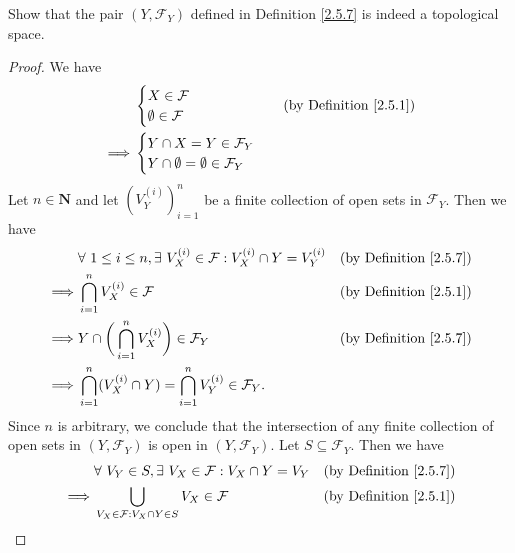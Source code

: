 \begin{exercise}\label{ex 2.5.12}
    Show that the pair \((Y, \mathcal{F}_Y)\) defined in Definition \ref{2.5.7} is indeed a topological space.
\end{exercise}

\begin{proof}
    We have
    \begin{align*}
                 & \begin{cases}
            X \in \mathcal{F} \\
            \emptyset \in \mathcal{F}
        \end{cases} & \text{(by Definition \ref{2.5.1})} \\
        \implies & \begin{cases}
            Y \cap X = Y \in \mathcal{F}_Y \\
            Y \cap \emptyset = \emptyset \in \mathcal{F}_Y
        \end{cases}
    \end{align*}
    Let \(n \in \mathbf{N}\) and let \((V_Y^{(i)})_{i = 1}^n\) be a finite collection of open sets in \(\mathcal{F}_Y\).
    Then we have
    \begin{align*}
                 & \forall\ 1 \leq i \leq n, \exists\ V_X^{(i)} \in \mathcal{F} : V_X^{(i)} \cap Y = V_Y^{(i)} & \text{(by Definition \ref{2.5.7})} \\
        \implies & \bigcap_{i = 1}^n V_X^{(i)} \in \mathcal{F}                                                 & \text{(by Definition \ref{2.5.1})} \\
        \implies & Y \cap \bigg(\bigcap_{i = 1}^n V_X^{(i)}\bigg) \in \mathcal{F}_Y                            & \text{(by Definition \ref{2.5.7})} \\
        \implies & \bigcap_{i = 1}^n (V_X^{(i)} \cap Y) = \bigcap_{i = 1}^n V_Y^{(i)} \in \mathcal{F}_Y.
    \end{align*}
    Since \(n\) is arbitrary, we conclude that the intersection of any finite collection of open sets in \((Y, \mathcal{F}_Y)\) is open in \((Y, \mathcal{F}_Y)\).
    Let \(S \subseteq \mathcal{F}_Y\).
    Then we have
    \begin{align*}
                 & \forall\ V_Y \in S, \exists\ V_X \in \mathcal{F} : V_X \cap Y = V_Y                                        & \text{(by Definition \ref{2.5.7})} \\
        \implies & \bigcup_{V_X \in \mathcal{F} : V_X \cap Y \in S} V_X \in \mathcal{F}                                       & \text{(by Definition \ref{2.5.1})} \\

\end{align*}
\end{proof}
